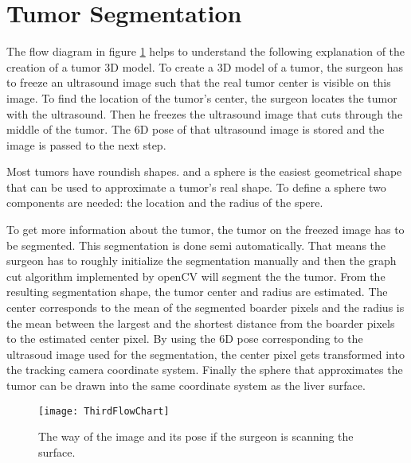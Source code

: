 \section{Tumor Segmentation}
\label{sec:tumorSegmentation}
The flow diagram in figure \ref{fig:ThirdFlowChart} helps to understand the
following explanation of the creation of a tumor 3D model.
To create a 3D model of a tumor, the surgeon has to freeze an ultrasound image
such that the real tumor center is visible on this image. To find the location
of the tumor's center, the surgeon locates the tumor with the
ultrasound. Then he freezes the ultrasound image that cuts through the middle of
the tumor. The 6D pose of that ultrasound image is stored and the image is
passed to the next step.

Most tumors have roundish shapes. and a sphere is the easiest
geometrical shape that can be used to approximate a tumor's real shape. To
define a sphere two components are needed: the location and the radius of the
spere.

To get more information about the tumor, the tumor on the freezed image has to be segmented. This
segmentation is done semi automatically. That means the surgeon has to
roughly initialize the segmentation manually and then the graph cut algorithm
implemented by openCV will segment the the tumor. From the resulting
segmentation shape, the tumor center and radius are estimated. The center
corresponds to the mean of the segmented boarder pixels and the radius is the
mean between the largest and the shortest distance from the boarder pixels to
the estimated center pixel. By using the 6D pose corresponding to the ultrasoud
image used for the segmentation, the center pixel gets transformed into the
tracking camera coordinate system. Finally the sphere that approximates the
tumor can be drawn into the same coordinate system as the liver surface.
\begin{figure}[H]
  \centering
 \texttt{[image: ThirdFlowChart]}
  \caption{The way of the image and its pose if the surgeon is scanning the
    surface.}
  \label{fig:ThirdFlowChart}
\end{figure}

